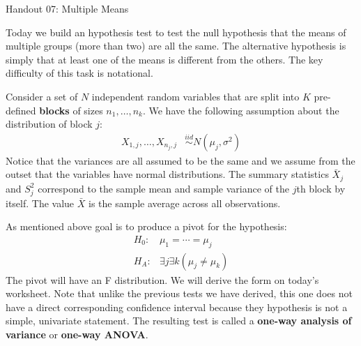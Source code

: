 \documentclass{tufte-handout}
\newcommand{\iid}{\stackrel{iid}{\sim}}
\begin{document}
\justify

{\LARGE Handout 07: Multiple Means}

\vspace*{18pt}

\noindent
Today we build an hypothesis test to test the null hypothesis that the
means of multiple groups (more than two) are all the same. The alternative
hypothesis is simply that at least one of the means is different from the
others. The key difficulty of this task is notational. 

Consider a set of $N$ independent random variables that are split into $K$ 
pre-defined \textbf{blocks} of sizes $n_1, \ldots, n_k$. We have the 
following assumption about the distribution of block $j$:
\begin{align*}
X_{1, j}, \ldots, X_{n_j, j} &\iid N(\mu_j, \sigma^2)
\end{align*}
Notice that the variances are all assumed to be the same and we assume from
the outset that the variables have normal distributions. The summary
statistics $\bar{X}_j$ and $S^2_j$ correspond to the sample mean and sample
variance of the $j$th block by itself. The value $\bar{X}$ is the sample
average across all observations.

As mentioned above goal is to produce a pivot for the hypothesis:
\begin{align*}
H_0:& \mu_1 = \cdots = \mu_j \\
H_A:& \exists j \exists k (\mu_j \neq \mu_k)
\end{align*}
The pivot will have an F distribution. We will derive the form on today's
worksheet. Note that unlike the previous tests we have derived, this one
does not have a direct corresponding confidence interval because they 
hypothesis is not a simple, univariate statement. The resulting test is
called a \textbf{one-way analysis of variance} or \textbf{one-way ANOVA}.
\end{document}
